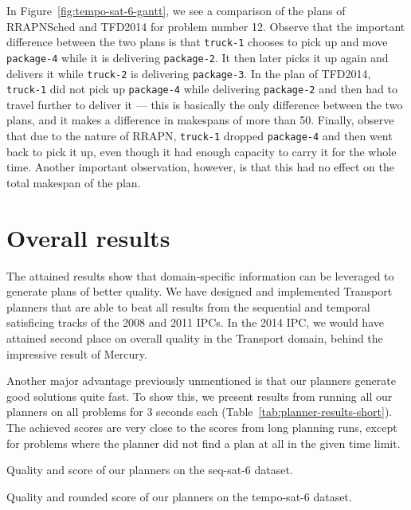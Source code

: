 {In Figure~\ref{fig:tempo-sat-6-gantt}, we see a comparison of the plans
of RRAPNSched and TFD2014 for problem number 12.
Observe that the important difference between the two plans
is that \texttt{truck-1} chooses to pick up and move \texttt{package-4}
while it is delivering \texttt{package-2}. It then later picks it up again and delivers
it while \texttt{truck-2} is delivering \texttt{package-3}.
In the plan of TFD2014, \texttt{truck-1} did not pick up \texttt{package-4}
while delivering \texttt{package-2} and then had to travel further to deliver it
--- this is basically the only difference between the two plans,
and it makes a difference in makespans of more than 50.
Finally, observe that due to the nature of RRAPN, \texttt{truck-1}
dropped \texttt{package-4} and then went back to pick it up, even though it had enough capacity
to carry it for the whole time. Another important observation, however, is that this had no effect on the total makespan
of the plan.

\section{Overall results}

The attained results show that domain-specific information can be leveraged
to generate plans of better quality.
We have designed and implemented Transport planners that are able to beat
all results from the sequential
and temporal satisficing tracks of the 2008 and 2011 IPCs.
In the 2014 IPC, we would have attained second place on overall quality in the Transport domain, behind the impressive result of Mercury.

Another major advantage previously unmentioned is that
our planners generate good solutions quite fast.
To show this, we present results from running all our planners on all problems for 3 seconds each (Table~\ref{tab:planner-results-short}).
The achieved scores are very close to the
scores from long planning runs, except for problems
where the planner did not find a plan at all in the
given time limit.

\begin{table}[tbp]
\centering
\begin{subtable}{0.48\textwidth}
\centering
\scriptsize
\renewcommand{\footnotesize}{\scriptsize}
\setlength{\tabcolsep}{3.5pt}

\caption{Quality and score of our planners on the seq-sat-6 dataset.}
\label{tab:seq-sat-6-ipc-scores-short}
\end{subtable}
\quad
\begin{subtable}{0.48\textwidth}
\centering
\scriptsize
\renewcommand{\footnotesize}{\scriptsize}
\setlength{\tabcolsep}{2pt}

\caption{Quality and rounded score of our planners on the tempo-sat-6 dataset.}
\label{tab:tempo-sat-6-ipc-scores-short}
\end{subtable}


\end{table}}
